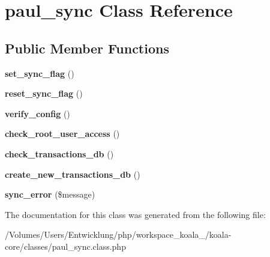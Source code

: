 \hypertarget{classpaul__sync}{
\section{paul\_\-sync Class Reference}
\label{classpaul__sync}
}
\subsection*{Public Member Functions}
\begin{DoxyCompactItemize}
\item 
\hypertarget{classpaul__sync_a596b0bed8fc4c6b46e73326a5b9999f7}{
{\bfseries set\_\-sync\_\-flag} ()}
\label{classpaul__sync_a596b0bed8fc4c6b46e73326a5b9999f7}

\item 
\hypertarget{classpaul__sync_ad23e86a99ff0b44dd296bf22b07615f0}{
{\bfseries reset\_\-sync\_\-flag} ()}
\label{classpaul__sync_ad23e86a99ff0b44dd296bf22b07615f0}

\item 
\hypertarget{classpaul__sync_a1be1d45b65c27e902660a655a4189a61}{
{\bfseries verify\_\-config} ()}
\label{classpaul__sync_a1be1d45b65c27e902660a655a4189a61}

\item 
\hypertarget{classpaul__sync_a86080ddc5185f622d6472dc11d0702c0}{
{\bfseries check\_\-root\_\-user\_\-access} ()}
\label{classpaul__sync_a86080ddc5185f622d6472dc11d0702c0}

\item 
\hypertarget{classpaul__sync_aeadd05d985307091a2ae95f5f9739c91}{
{\bfseries check\_\-transactions\_\-db} ()}
\label{classpaul__sync_aeadd05d985307091a2ae95f5f9739c91}

\item 
\hypertarget{classpaul__sync_a2b5ccae22a1271312c327416a615e4cb}{
{\bfseries create\_\-new\_\-transactions\_\-db} ()}
\label{classpaul__sync_a2b5ccae22a1271312c327416a615e4cb}

\item 
\hypertarget{classpaul__sync_ac067aa618b45bd23cc49506fffce0c63}{
{\bfseries sync\_\-error} (\$message)}
\label{classpaul__sync_ac067aa618b45bd23cc49506fffce0c63}

\end{DoxyCompactItemize}


The documentation for this class was generated from the following file:\begin{DoxyCompactItemize}
\item 
/Volumes/Users/Entwicklung/php/workspace\_\-koala\_/koala-\/core/classes/paul\_\-sync.class.php\end{DoxyCompactItemize}
